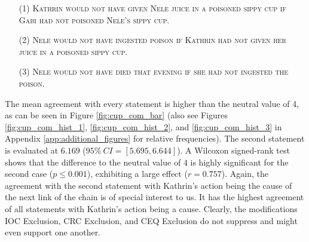 \documentclass[egregdoesnotlikesansseriftitles,12pt]{scrartcl}
\begin{document}
\begin{itemize}
   \item[(1)]\textsc{Kathrin would not have given Nele juice in a poisoned sippy cup if Gabi had not poisoned Nele's sippy cup.}
   \item[(2)]\textsc{Nele would not have ingested poison if Kathrin had not given her juice in a poisoned sippy cup.}
   \item[(3)]\textsc{Nele would not have died that evening if she had not ingested the poison.}
\end{itemize}

\noindent The mean agreement with every statement is higher than the neutral value of 4, as can be seen in Figure \ref{fig:cup_com_bar} (also see Figures \ref{fig:cup_com_hist_1}, \ref{fig:cup_com_hist_2}, and \ref{fig:cup_com_hist_3} in Appendix \ref{app:additional_figures} for relative frequencies). The second statement is evaluated at $6.169$ ($95\%~CI=[5.695,6.644]$). A Wilcoxon signed-rank test shows that the difference to the neutral value of $4$ is highly significant for the second case ($p \leq 0.001$), exhibiting a large effect ($r=0.757$). Again, the agreement with the second statement with Kathrin's action being the cause of the next link of the chain is of special interest to us. It has the highest agreement of all statements with Kathrin's action being a cause. Clearly, the modifications IOC Exclusion, CRC Exclusion, and CEQ Exclusion do not suppress and might even support one another.
\end{document}
